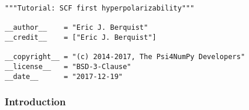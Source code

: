 \begin{verbatim}
"""Tutorial: SCF first hyperpolarizability"""

__author__    = "Eric J. Berquist"
__credit__    = ["Eric J. Berquist"]

__copyright__ = "(c) 2014-2017, The Psi4NumPy Developers"
__license__   = "BSD-3-Clause"
__date__      = "2017-12-19"
\end{verbatim}


\subsubsection{Introduction}


